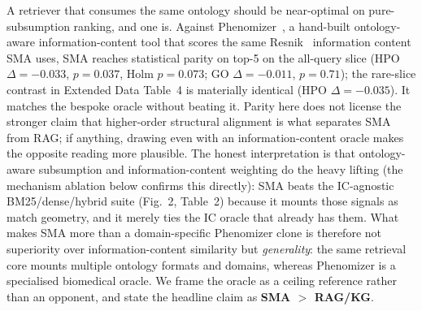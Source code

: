 \documentclass[pdflatex,sn-nature]{sn-jnl}
\begin{document}
A retriever that consumes the same ontology should be near-optimal on
pure-subsumption ranking, and one is. Against Phenomizer~\cite{kohler2009phenomizer},
a hand-built ontology-aware information-content tool that scores the same
Resnik~\cite{resnik1995} information content SMA uses, SMA reaches statistical
parity on top-5 on the all-query slice (HPO $\Delta{=}{-}0.033$, $p{=}0.037$, Holm
$p{=}0.073$; GO $\Delta{=}{-}0.011$, $p{=}0.71$); the rare-slice contrast in
Extended Data Table~4 is materially identical (HPO $\Delta{=}{-}0.035$). It matches
the bespoke oracle without beating it. Parity here does not license the stronger claim that higher-order structural
alignment is what separates SMA from RAG; if anything, drawing even with an
information-content oracle makes the opposite reading more plausible. The honest
interpretation is that ontology-aware subsumption and information-content weighting
do the heavy lifting (the mechanism ablation below confirms this directly): SMA
beats the IC-agnostic BM25/dense/hybrid suite (Fig.~2, Table~2) because it mounts
those signals as match geometry, and it merely ties the IC oracle that already has
them. What makes SMA more than a domain-specific Phenomizer clone is therefore not
superiority over information-content similarity but \emph{generality}: the same
retrieval core mounts multiple ontology formats and domains, whereas Phenomizer is
a specialised biomedical oracle. We frame the oracle as a ceiling reference rather
than an opponent, and state the headline claim as \textbf{SMA $>$ RAG/KG}.
\end{document}

